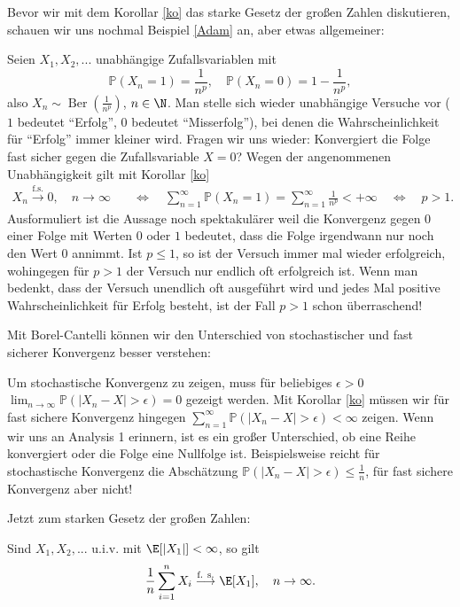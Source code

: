 Bevor wir mit dem Korollar \ref{ko} das starke Gesetz der gro\ss en Zahlen diskutieren, schauen wir uns nochmal Beispiel \ref{Adam} an, aber etwas allgemeiner:
\begin{example}
Seien $X_1, X_2, ... $ unabh\"angige Zufallsvariablen mit $$\mathbb{P}(X_n = 1) = \frac{1}{n^p}, \quad \mathbb{P}(X_n = 0) = 1 - \frac{1}{n^p},$$ also $X_n \sim \operatorname{Ber}(\frac{1}{n^p})$, $n \in \N$. Man stelle sich wieder unabh\"angige Versuche vor ($1$ bedeutet \enquote{Erfolg}, $0$ bedeutet \enquote{Misserfolg}), bei denen die Wahrscheinlichkeit f\"ur \enquote{Erfolg} immer kleiner wird. Fragen wir uns wieder: Konvergiert die Folge fast sicher gegen die Zufallsvariable $X=0$? Wegen der angenommenen Unabh\"angigkeit gilt mit Korollar \ref{ko} 
\begin{align*}
	X_n\overset{\text{f.s.}}{\to} 0,\quad n\to\infty \quad &\Leftrightarrow\quad \sum_{n=1}^\infty \mathbb P(X_n=1)=\sum_{n=1}^\infty \frac{1}{n^p}<+\infty\quad
	\Leftrightarrow\quad p>1.
\end{align*}
Ausformuliert ist die Aussage noch spektakul\"arer weil die Konvergenz gegen $0$ einer Folge mit Werten $0$ oder $1$ bedeutet, dass die Folge irgendwann nur noch den Wert $0$ annimmt. Ist $p\leq 1$, so ist der Versuch immer mal wieder erfolgreich, wohingegen f\"ur $p>1$ der Versuch nur endlich oft erfolgreich ist. Wenn man bedenkt, dass der Versuch unendlich oft ausgef\"uhrt wird und jedes Mal positive Wahrscheinlichkeit f\"ur Erfolg besteht, ist der Fall $p>1$ schon \"uberraschend!
\end{example}
Mit Borel-Cantelli k\"onnen wir den Unterschied von stochastischer und fast sicherer Konvergenz besser verstehen:
\begin{bem}\label{bem4}
	Um stochastische Konvergenz zu zeigen, muss f\"ur beliebiges $\epsilon>0$ $\lim_{n\to\infty}\mathbb P(|X_n-X|>\epsilon)=0$ gezeigt werden. Mit Korollar \ref{ko} m\"ussen wir f\"ur fast sichere Konvergenz hingegen $\sum_{n=1}^\infty \mathbb P(|X_n-X|>\epsilon)<\infty$ zeigen. Wenn wir uns an Analysis 1 erinnern, ist es ein gro\ss er Unterschied, ob eine Reihe konvergiert oder die Folge eine Nullfolge ist. Beispielsweise reicht f\"ur stochastische Konvergenz die Absch\"atzung $\mathbb P(|X_n-X|>\epsilon)\leq \frac{1}{n}$, f\"ur fast sichere Konvergenz aber nicht!	
\end{bem}


Jetzt zum starken Gesetz der gro\ss en Zahlen:

\begin{satz}
	Sind $X_1,X_2,...$ u.i.v. mit $\E[|X_1|] < \infty$, so gilt \[ \frac{1}{n} \sum\limits_{i=1}^{n} X_i \overset{\text{f. s.}}{\longrightarrow} \E[X_1], \quad n \to \infty. \]
\end{satz}


